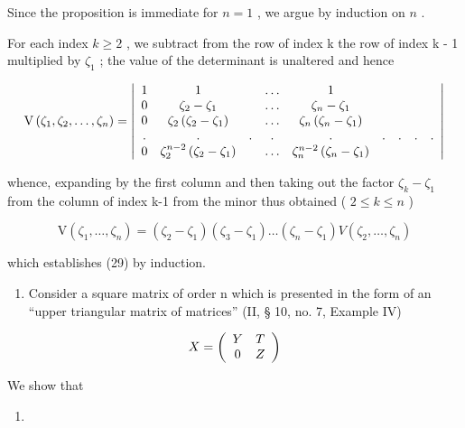 Since the proposition is immediate for \(n = 1\) , we argue by induction on \(n\) .

For each index \(k \geqslant 2\) , we subtract from the row of index k the row of index k - 1 multiplied by \(\zeta_{1}\) ; the value of the determinant is unaltered and hence

\[
\mathrm{V} \left(\zeta_ {1}, \zeta_ {2}, \dots , \zeta_ {n}\right) = \left| \begin{array}{c c c c c c c c c} 1 & 1 & & \dots & 1 \\ 0 & \zeta_ {2} - \zeta_ {1} & & \dots & \zeta_ {n} - \zeta_ {1} \\ 0 & \zeta_ {2} \left(\zeta_ {2} - \zeta_ {1}\right) & & \dots & \zeta_ {n} \left(\zeta_ {n} - \zeta_ {1}\right) \\ . & . & . & . & . & . & . & . & . \\ 0 & \zeta_ {2} ^ {n - 2} \left(\zeta_ {2} - \zeta_ {1}\right) & & \dots & \zeta_ {n} ^ {n - 2} \left(\zeta_ {n} - \zeta_ {1}\right) \end{array} \right|
\]

whence, expanding by the first column and then taking out the factor \(\zeta_{k}-\zeta_{1}\) from the column of index k-1 from the minor thus obtained ( \(2\leqslant k\leqslant n\) )

\[
\mathrm{V} \left(\zeta_ {1}, \dots , \zeta_ {n}\right) = \left(\zeta_ {2} - \zeta_ {1}\right) \left(\zeta_ {3} - \zeta_ {1}\right) \dots \left(\zeta_ {n} - \zeta_ {1}\right) V \left(\zeta_ {2}, \dots , \zeta_ {n}\right)
\]

which establishes (29) by induction.

\begin{enumerate}
\def\labelenumi{(\arabic{enumi})}
\setcounter{enumi}{1}
\tightlist
\item
  Consider a square matrix of order n which is presented in the form of an ``upper triangular matrix of matrices'' (II, § 10, no. 7, Example IV)
\end{enumerate}

\[
X = \left( \begin{array}{c c} Y & T \\ 0 & Z \end{array} \right)
\]

We show that

\begin{enumerate}
\def\labelenumi{(\arabic{enumi})}
\setcounter{enumi}{29}
\tightlist
\item
\end{enumerate}

